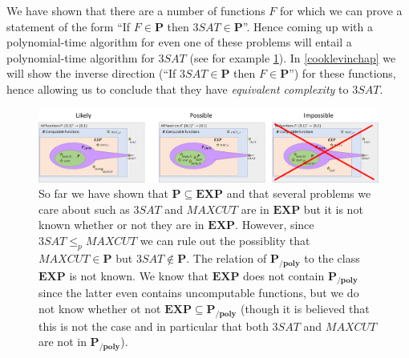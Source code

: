 We have shown that there are a number of functions \(F\) for which we
can prove a statement of the form ``If \(F\in \mathbf{P}\) then
\(3\ensuremath{\mathit{SAT}} \in \mathbf{P}\)''. Hence coming up with a
polynomial-time algorithm for even one of these problems will entail a
polynomial-time algorithm for \(3\ensuremath{\mathit{SAT}}\) (see for
example \cref{reductiondiagramfig}). In \cref{cooklevinchap} we will
show the inverse direction (``If
\(3\ensuremath{\mathit{SAT}} \in \mathbf{P}\) then
\(F\in \mathbf{P}\)'') for these functions, hence allowing us to
conclude that they have \emph{equivalent complexity} to
\(3\ensuremath{\mathit{SAT}}\).


\begin{figure}
\centering
\includegraphics[width=\textwidth, height=0.25\paperheight, keepaspectratio]{../figure/reduction_inc_diagram.png}
\caption{So far we have shown that \(\mathbf{P} \subseteq \mathbf{EXP}\)
and that several problems we care about such as
\(3\ensuremath{\mathit{SAT}}\) and \(\ensuremath{\mathit{MAXCUT}}\) are
in \(\mathbf{EXP}\) but it is not known whether or not they are in
\(\mathbf{EXP}\). However, since
\(3\ensuremath{\mathit{SAT}} \leq_p \ensuremath{\mathit{MAXCUT}}\) we
can rule out the possiblity that
\(\ensuremath{\mathit{MAXCUT}} \in \mathbf{P}\) but
\(3\ensuremath{\mathit{SAT}} \not\in \mathbf{P}\). The relation of
\(\mathbf{P_{/poly}}\) to the class \(\mathbf{EXP}\) is not known. We
know that \(\mathbf{EXP}\) does not contain \(\mathbf{P_{/poly}}\) since
the latter even contains uncomputable functions, but we do not know
whether ot not \(\mathbf{EXP} \subseteq \mathbf{P_{/poly}}\) (though it
is believed that this is not the case and in particular that both
\(3\ensuremath{\mathit{SAT}}\) and \(\ensuremath{\mathit{MAXCUT}}\) are
not in \(\mathbf{P_{/poly}}\)).}
\label{reductiondiagramfig}
\end{figure}


